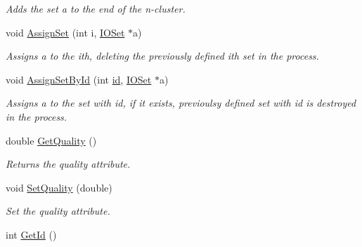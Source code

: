 \begin{DoxyCompactItemize}
\begin{DoxyCompactList}\small\item\em Adds the set a to the end of the n-\/cluster. \item\end{DoxyCompactList}\item 
\hypertarget{class_n_cluster_a7d5ab8fb3293b472b57cb9e964f5b90e}{
void \hyperlink{class_n_cluster_a7d5ab8fb3293b472b57cb9e964f5b90e}{AssignSet} (int i, \hyperlink{class_i_o_set}{IOSet} $\ast$a)}
\label{class_n_cluster_a7d5ab8fb3293b472b57cb9e964f5b90e}

\begin{DoxyCompactList}\small\item\em Assigns a to the ith, deleting the previously defined ith set in the process. \item\end{DoxyCompactList}\item 
\hypertarget{class_n_cluster_a0b117e61aee299f09f385f0b890bf0e1}{
void \hyperlink{class_n_cluster_a0b117e61aee299f09f385f0b890bf0e1}{AssignSetById} (int \hyperlink{class_n_cluster_a9360cadd4e338b91de61f86997acc890}{id}, \hyperlink{class_i_o_set}{IOSet} $\ast$a)}
\label{class_n_cluster_a0b117e61aee299f09f385f0b890bf0e1}

\begin{DoxyCompactList}\small\item\em Assigns a to the set with id, if it exists, previoulsy defined set with id is destroyed in the process. \item\end{DoxyCompactList}\item 
\hypertarget{class_n_cluster_aad3afb3c6ca495bd69fe0593455ca785}{
double \hyperlink{class_n_cluster_aad3afb3c6ca495bd69fe0593455ca785}{GetQuality} ()}
\label{class_n_cluster_aad3afb3c6ca495bd69fe0593455ca785}

\begin{DoxyCompactList}\small\item\em Returns the quality attribute. \item\end{DoxyCompactList}\item 
\hypertarget{class_n_cluster_abf7185a77e66f15d4ff3b400d51d1064}{
void \hyperlink{class_n_cluster_abf7185a77e66f15d4ff3b400d51d1064}{SetQuality} (double)}
\label{class_n_cluster_abf7185a77e66f15d4ff3b400d51d1064}

\begin{DoxyCompactList}\small\item\em Set the quality attribute. \item\end{DoxyCompactList}\item 
\hypertarget{class_n_cluster_a185204e735f03d9670855e0767592149}{
int \hyperlink{class_n_cluster_a185204e735f03d9670855e0767592149}{GetId} ()}
\label{class_n_cluster_a185204e735f03d9670855e0767592149}


\end{DoxyCompactItemize}

